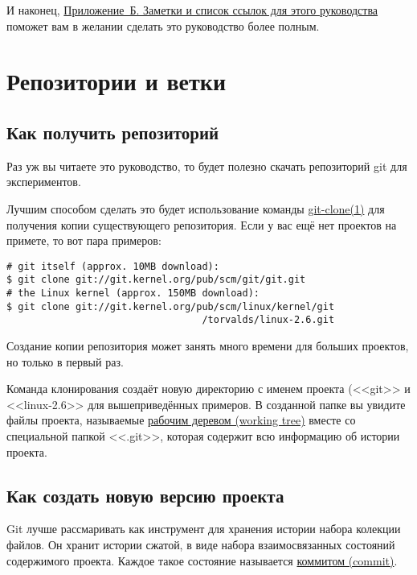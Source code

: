 \documentclass[a4paper, 12pt, oneside]{scrreprt}
\begin{document}
И наконец, \href{#appendixb}{Приложение~Б. Заметки и список ссылок для этого
руководства} поможет вам в желании сделать это руководство более
полным.
%
%
\chapter{Репозитории и ветки}
\hypertarget{#chapter1}{}

\section{Как получить репозиторий}

Раз уж вы читаете это руководство, то будет полезно скачать репозиторий git для 
экспериментов.

Лучшим способом сделать это будет использование команды
\href{http://www.kernel.org/pub/software/scm/git/docs/git-clone.html}{git-clone(1)}
для получения копии существующего репозитория. Если у вас ещё нет проектов на 
примете, то вот пара примеров:

\begin{lstlisting}
# git itself (approx. 10MB download):
$ git clone git://git.kernel.org/pub/scm/git/git.git
# the Linux kernel (approx. 150MB download):
$ git clone git://git.kernel.org/pub/scm/linux/kernel/git
                                  /torvalds/linux-2.6.git
\end{lstlisting}

Создание копии репозитория может занять много времени для больших проектов, но 
только в первый раз.

Команда клонирования создаёт новую директорию с именем проекта (<<git>> и <<linux-2.6>>
для вышеприведённых примеров. В созданной папке вы увидите файлы проекта, называемые
\href{#def_working_tree}{рабочим деревом (working tree)} вместе со специальной папкой 
<<.git>>, которая содержит всю информацию об истории проекта.



\section{Как создать новую версию проекта}

Git лучше рассмаривать как инструмент для хранения истории набора колекции файлов.
Он хранит истории сжатой, в виде набора взаимосвязанных состояний содержимого
проекта. Каждое такое состояние называется \href{#def_commit}{коммитом (commit)}.
\end{document}

